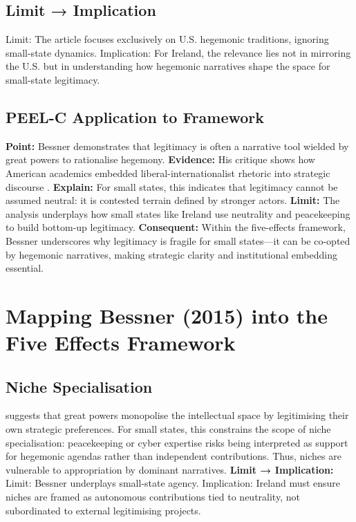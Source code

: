 \subsection*{Limit → Implication}
Limit: The article focuses exclusively on U.S. hegemonic traditions, ignoring small-state dynamics.  
Implication: For Ireland, the relevance lies not in mirroring the U.S. but in understanding how hegemonic narratives shape the space for small-state legitimacy.

\subsection*{PEEL-C Application to Framework}
\textbf{Point:} Bessner demonstrates that legitimacy is often a narrative tool wielded by great powers to rationalise hegemony.  
\textbf{Evidence:} His critique shows how American academics embedded liberal-internationalist rhetoric into strategic discourse \parencite{BESSNER_2015}.  
\textbf{Explain:} For small states, this indicates that legitimacy cannot be assumed neutral: it is contested terrain defined by stronger actors.  
\textbf{Limit:} The analysis underplays how small states like Ireland use neutrality and peacekeeping to build bottom-up legitimacy.  
\textbf{Consequent:} Within the five-effects framework, Bessner underscores why legitimacy is fragile for small states—it can be co-opted by hegemonic narratives, making strategic clarity and institutional embedding essential.

\section*{Mapping Bessner (2015) into the Five Effects Framework}

\subsection*{Niche Specialisation}
\textcite{BESSNER_2015} suggests that great powers monopolise the intellectual space by legitimising their own strategic preferences. For small states, this constrains the scope of niche specialisation: peacekeeping or cyber expertise risks being interpreted as support for hegemonic agendas rather than independent contributions. Thus, niches are vulnerable to appropriation by dominant narratives.  
\textbf{Limit → Implication:} Limit: Bessner underplays small-state agency. Implication: Ireland must ensure niches are framed as autonomous contributions tied to neutrality, not subordinated to external legitimising projects.

